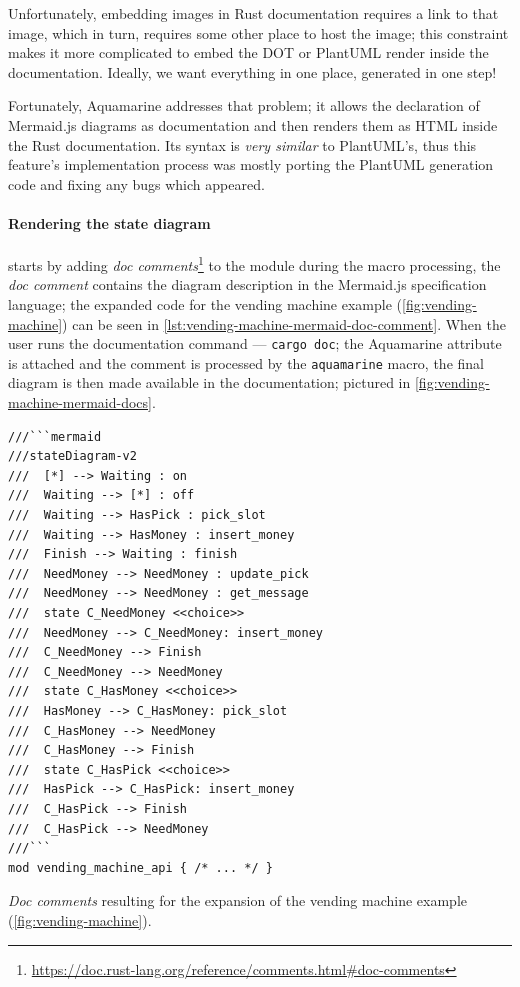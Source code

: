 Unfortunately, embedding images in Rust documentation requires a link to that image, which in turn, requires some other place to host the image;
this constraint makes it more complicated to embed the DOT or PlantUML render inside the documentation.
Ideally, we want everything in one place, generated in one step!

Fortunately, Aquamarine addresses that problem;
it allows the declaration of Mermaid.js diagrams as documentation and then renders them as HTML inside the Rust documentation.
Its syntax is \emph{very similar} to PlantUML's,
thus this feature's implementation process was mostly porting the PlantUML generation code and fixing any bugs which appeared.

\paragraph{Rendering the state diagram} starts by adding \emph{doc comments}\footnote{\url{https://doc.rust-lang.org/reference/comments.html\#doc-comments}}
to the module during the macro processing, the \emph{doc comment} contains the diagram description in the Mermaid.js specification language;
the expanded code for the vending machine example (\autoref{fig:vending-machine}) can be seen in \autoref{lst:vending-machine-mermaid-doc-comment}.
When the user runs the documentation command --- \texttt{cargo doc}; the Aquamarine attribute is attached and
the comment is processed by the \texttt{aquamarine} macro, the final diagram is then made available in the documentation;
pictured in \autoref{fig:vending-machine-mermaid-docs}.

\begin{listing}
    \begin{verbatim}
///```mermaid
///stateDiagram-v2
///  [*] --> Waiting : on
///  Waiting --> [*] : off
///  Waiting --> HasPick : pick_slot
///  Waiting --> HasMoney : insert_money
///  Finish --> Waiting : finish
///  NeedMoney --> NeedMoney : update_pick
///  NeedMoney --> NeedMoney : get_message
///  state C_NeedMoney <<choice>>
///  NeedMoney --> C_NeedMoney: insert_money
///  C_NeedMoney --> Finish
///  C_NeedMoney --> NeedMoney
///  state C_HasMoney <<choice>>
///  HasMoney --> C_HasMoney: pick_slot
///  C_HasMoney --> NeedMoney
///  C_HasMoney --> Finish
///  state C_HasPick <<choice>>
///  HasPick --> C_HasPick: insert_money
///  C_HasPick --> Finish
///  C_HasPick --> NeedMoney
///```
mod vending_machine_api { /* ... */ }
    \end{verbatim}
    \caption{\emph{Doc comments} resulting for the expansion of the vending machine example (\autoref{fig:vending-machine}).}
    \label{lst:vending-machine-mermaid-doc-comment}
\end{listing}

